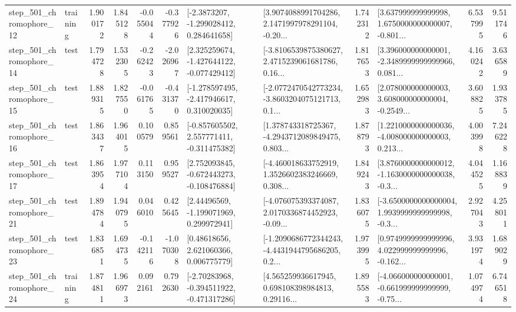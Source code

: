 \begin{tabular}{llrrrrllrlrr}
  step\_501\_chromophore\_12 &  training &      1.900172 &    1.845128 &     -0.055044 & -0.377926 &     [-2.3873207, -1.299028412, 0.284641658] &  [3.9074088991704286, 2.1471997978291104, -0.20... &       1.742312 &  [3.637999999999998, 1.6750000000000007, -0.801... &            6.537995 &          9.511746 \\
  step\_501\_chromophore\_14 &      test &      1.794728 &    1.532305 &     -0.262423 & -2.026967 &   [2.325259674, -1.427644122, -0.077429412] &  [-3.8106539875380627, 2.4715239061681786, 0.16... &       1.817653 &  [3.396000000000001, -2.3489999999999966, 0.081... &            4.160242 &          3.636589 \\
  step\_501\_chromophore\_15 &      test &      1.889315 &    1.827550 &     -0.061765 & -0.431370 &   [-1.278597495, -2.417946617, 0.310020035] &  [-2.0772470542773234, -3.8603204075121713, 0.1... &       1.652983 &  [2.078000000000003, 3.608000000000004, -0.2549... &            3.608825 &          1.933785 \\
  step\_501\_chromophore\_16 &      test &      1.863437 &    1.964015 &      0.100579 &  0.859561 &   [-0.857605502, 2.557771411, -0.311475382] &  [1.378743318725367, -4.2943712089849475, 0.803... &       1.878793 &  [1.2210000000000036, -4.008000000000003, 0.213... &            4.003998 &          7.246228 \\
  step\_501\_chromophore\_17 &      test &      1.863954 &    1.977104 &      0.113150 &  0.959527 &   [2.752093845, -0.672443273, -0.108476884] &  [-4.460018633752919, 1.3526602383246669, 0.308... &       1.849243 &  [3.8760000000000012, -1.1630000000000038, -0.3... &            4.044525 &          1.168839 \\
  step\_501\_chromophore\_21 &      test &      1.894784 &    1.940795 &      0.046010 &  0.425645 &     [2.44496569, -1.199071969, 0.299972941] &  [-4.076075393374087, 2.0170336874452923, -0.09... &       1.836075 &  [-3.6500000000000004, 1.9939999999999998, -0.3... &            2.927043 &          4.258011 \\
  step\_501\_chromophore\_23 &      test &      1.836851 &    1.694735 &     -0.142116 & -1.070308 &      [0.48618656, 2.621060366, 0.006775779] &  [-1.2090686772344243, -4.4431944795686205, 0.2... &       1.973995 &  [0.9749999999999996, 4.022999999999996, -0.162... &            3.931974 &          1.689029 \\
  step\_501\_chromophore\_24 &  training &      1.874811 &    1.966973 &      0.092161 &  0.792630 &   [-2.70283968, -0.394511922, -0.471317286] &  [4.565259936617945, 0.698108398984813, 0.29116... &       1.895583 &  [-4.066000000000001, -0.661999999999999, -0.75... &            1.074974 &          6.746518 \\

\end{tabular}
